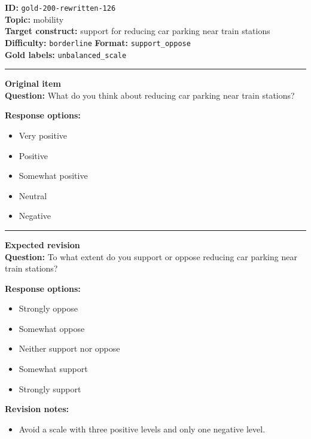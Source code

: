 \documentclass[10pt,a4paper]{article}
\newcommand{\sectionline}{\vspace{0.15em}\hrule\vspace{0.35em}}
\begin{document}
\begin{tcolorbox}[colframe=FlawRed,colback=white,colbacktitle=FlawRed!9,coltitle=black,title={Item 126\hfill Flawed item}]
\textbf{ID:} \texttt{gold-200-rewritten-126}\\
\textbf{Topic:} mobility\\
\textbf{Target construct:} support for reducing car parking near train stations\\
\textbf{Difficulty:} \texttt{borderline} \quad \textbf{Format:} \texttt{support\_oppose}\\
\textbf{Gold labels:} \texttt{unbalanced\_scale}\\
\sectionline
\textbf{Original item}\\
\textbf{Question:} What do you think about reducing car parking near train stations?
\par\textbf{Response options:}
\begin{itemize}
\item Very positive
\item Positive
\item Somewhat positive
\item Neutral
\item Negative
\end{itemize}
\sectionline
\textbf{Expected revision}\\
\textbf{Question:} To what extent do you support or oppose reducing car parking near train stations?
\par\textbf{Response options:}
\begin{itemize}
\item Strongly oppose
\item Somewhat oppose
\item Neither support nor oppose
\item Somewhat support
\item Strongly support
\end{itemize}
\par\textbf{Revision notes:}
\begin{itemize}
\item Avoid a scale with three positive levels and only one negative level.
\end{itemize}
\end{tcolorbox}
\end{document}

